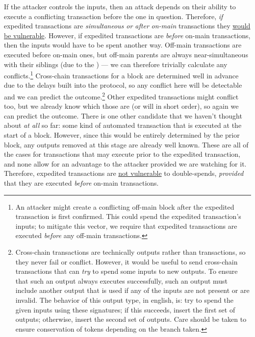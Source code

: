 If the attacker controls the inputs, then an attack depends on their ability to execute a conflicting transaction before the one in question.
Therefore, \emph{if} expedited transactions are \emph{simultaneous or after} \emph{on-main} transactions they \ul{would be vulnerable}.
However, if expedited transactions are \emph{before} on-main transactions, then the inputs would have to be spent another way.
Off-main transactions are executed before on-main ones, but off-main parents are always near-simultaneous with their siblings (due to the \AxiomOfUnifiedAncestry) --- we can therefore trivially calculate any conflicts.\footnote{
    An attacker might create a conflicting off-main block after the expedited transaction is first confirmed.
    This could spend the expedited transaction's inputs; to mitigate this vector, we require that expedited transactions are executed \emph{before} any off-main transactions.
}
Cross-chain transactions for a block are determined well in advance due to the delays built into the protocol, so any conflict here will be detectable and we can predict the outcome.\footnote{
    Cross-chain transactions are technically outputs rather than transactions, so they never fail or conflict.
    However, it would be useful to send cross-chain transactions that can \emph{try} to spend some inputs to new outputs.
    To ensure that such an output always executes successfully, such an output must include another output that is used if any of the inputs are not present or are invalid.
    The behavior of this output type, in english, is: try to spend the given inputs using these signatures; if this succeeds, insert the first set of outputs; otherwise, insert the second set of outputs.
    Care should be taken to ensure conservation of tokens depending on the branch taken.
}
Other expedited transactions might conflict too, but we already know which those are (or will in short order), so again we can predict the outcome.
There is one other candidate that we haven't thought about \emph{at all} so far: some kind of automated transaction that is executed at the start of a block.
However, since this would be entirely determined by the prior block, any outputs removed at this stage are already well known.
These are all of the cases for transactions that may execute prior to the expedited transaction, and none allow for an advantage to the attacker provided we are watching for it.
Therefore, expedited transactions are \ul{not vulnerable} to double-spends, \emph{provided} that they are executed \emph{before} on-main transactions.

